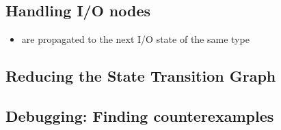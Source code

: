 \subsection{Handling I/O nodes}
\begin{itemize}
\item are propagated to the next I/O state of the same type
\end{itemize}

\subsection{Reducing the State Transition Graph}

\subsection{Debugging: Finding counterexamples}